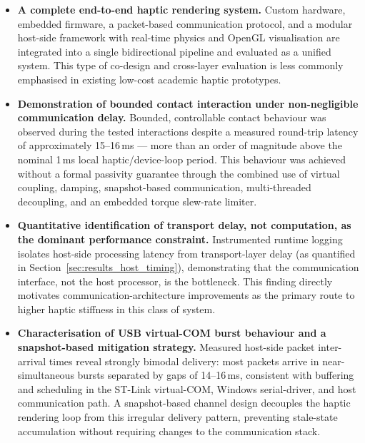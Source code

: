 \begin{itemize}
	\item \textbf{A complete end-to-end haptic rendering system.} Custom hardware, embedded firmware, a packet-based communication protocol, and a modular host-side framework with real-time physics and OpenGL visualisation are integrated into a single bidirectional pipeline and evaluated as a unified system. This type of co-design and cross-layer evaluation is less commonly emphasised in existing low-cost academic haptic prototypes.
	
	\item \textbf{Demonstration of bounded contact interaction under non-negligible communication delay.} Bounded, controllable contact behaviour was observed during the tested interactions despite a measured round-trip latency of approximately 15--16\,ms --- more than an order of magnitude above the nominal 1\,ms local haptic/device-loop period. This behaviour was achieved without a formal passivity guarantee through the combined use of virtual coupling, damping, snapshot-based communication, multi-threaded decoupling, and an embedded torque slew-rate limiter.
	
	\item \textbf{Quantitative identification of transport delay, not computation, as the dominant performance constraint.} Instrumented runtime logging isolates host-side processing latency from transport-layer delay (as quantified in Section~\ref{sec:results_host_timing}), demonstrating that the communication interface, not the host processor, is the bottleneck. This finding directly motivates communication-architecture improvements as the primary route to higher haptic stiffness in this class of system.
	
	\item \textbf{Characterisation of USB virtual-COM burst behaviour and a snapshot-based mitigation strategy.} Measured host-side packet inter-arrival times reveal strongly bimodal delivery: most packets arrive in near-simultaneous bursts separated by gaps of 14--16\,ms, consistent with buffering and scheduling in the ST-Link virtual-COM, Windows serial-driver, and host communication path. A snapshot-based channel design decouples the haptic rendering loop from this irregular delivery pattern, preventing stale-state accumulation without requiring changes to the communication stack.
\end{itemize}


